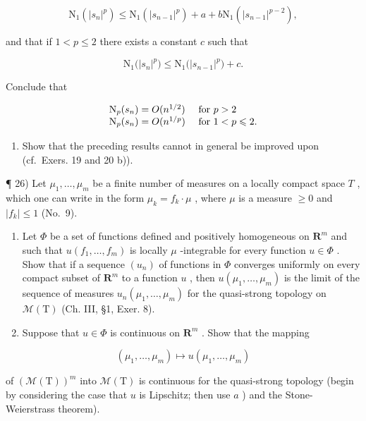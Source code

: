 \[
\mathrm{N} _ {1} (| s _ {n} | ^ {p}) \leqslant \mathrm{N} _ {1} (| s _ {n - 1} | ^ {p}) + a + b \mathrm{N} _ {1} (| s _ {n - 1} | ^ {p - 2}),
\]

and that if \(1 < p \leqslant 2\) there exists a constant \(c\) such that

\[
\mathrm{N} _ {1} \big (| s _ {n} | ^ {p} \big) \leqslant \mathrm{N} _ {1} \big (| s _ {n - 1} | ^ {p} \big) + c.
\]

Conclude that

\[
\begin{array}{l l} \mathrm{N} _ {p} (s _ {n}) = O (n ^ {1 / 2}) & \text { for } p > 2 \\ \mathrm{N} _ {p} (s _ {n}) = O (n ^ {1 / p}) & \text { for } 1 <   p \leqslant 2. \end{array}
\]

\begin{enumerate}
\def\labelenumi{\alph{enumi})}
\setcounter{enumi}{2}
\tightlist
\item
  Show that the preceding results cannot in general be improved upon (cf.~Exers. 19 and 20 b)).
\end{enumerate}

¶ 26) Let \(\mu_1, \ldots, \mu_m\) be a finite number of measures on a locally compact space \(T\) , which one can write in the form \(\mu_k = f_k \cdot \mu\) , where \(\mu\) is a measure \(\geqslant 0\) and \(|f_k| \leqslant 1\) (No.~9).

\begin{enumerate}
\def\labelenumi{\alph{enumi})}
\item
  Let \(\Phi\) be a set of functions defined and positively homogeneous on \(\mathbf{R}^m\) and such that \(u(f_1, \ldots, f_m)\) is locally \(\mu\) -integrable for every function \(u \in \Phi\) . Show that if a sequence \((u_n)\) of functions in \(\Phi\) converges uniformly on every compact subset of \(\mathbf{R}^m\) to a function \(u\) , then \(u(\mu_1, \ldots, \mu_m)\) is the limit of the sequence of measures \(u_n(\mu_1, \ldots, \mu_m)\) for the quasi-strong topology on \(\mathcal{M}(\mathrm{T})\) (Ch. III, §1, Exer. 8).
\item
  Suppose that \(u \in \Phi\) is continuous on \(\mathbf{R}^m\) . Show that the mapping
\end{enumerate}

\[
(\mu_ {1}, \dots , \mu_ {m}) \mapsto u (\mu_ {1}, \dots , \mu_ {m})
\]

of \((\mathcal{M}(\mathrm{T}))^m\) into \(\mathcal{M}(\mathrm{T})\) is continuous for the quasi-strong topology (begin by considering the case that \(u\) is Lipschitz; then use \(a\) ) and the Stone-Weierstrass theorem).

